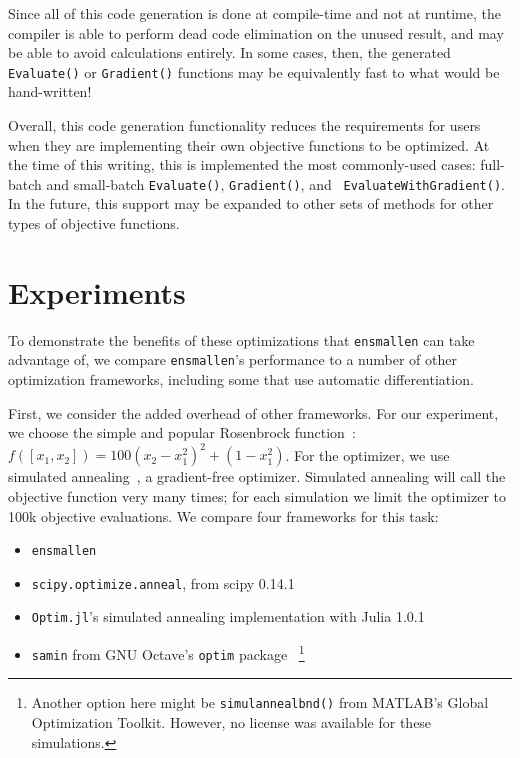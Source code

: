 \documentclass{article}
\begin{document}
Since all of this code generation is done at compile-time and not
at runtime, the compiler is able to perform dead code elimination
on the unused result, and may be able to avoid calculations entirely.  In some
cases, then, the generated {\tt Evaluate()} or {\tt Gradient()} functions may be
equivalently fast to what would be hand-written!

Overall, this code generation functionality reduces the requirements for users
when they are implementing their own objective functions to be optimized.  At
the time of this writing, this is implemented the most commonly-used cases:
full-batch and small-batch {\tt Evaluate()}, {\tt Gradient()}, and {\tt
EvaluateWithGradient()}.  In the future, this support may be expanded to other
sets of methods for other types of objective functions.


\vspace*{-0.3em}
\section{Experiments}
\vspace*{-0.5em}

To demonstrate the benefits of these optimizations that {\tt ensmallen} can take
advantage of, we compare {\tt ensmallen}'s performance to a number of other
optimization frameworks, including some that use automatic differentiation.

First, we consider the added overhead of other frameworks.  For our experiment,
we choose the simple and popular Rosenbrock function~\cite{Rosenbrock1960}:
$f([x_1, x_2]) = 100 (x_2 - x_1^2)^2 + (1 - x_1^2)$.  For the optimizer, we use
simulated annealing~\cite{kirkpatrick1983optimization},
a gradient-free optimizer.  Simulated annealing will call the objective function
very many times; for each simulation we limit the optimizer to 100k
objective evaluations.  We compare four frameworks for this task:

\vspace*{-0.3em}
\begin{itemize} \itemsep -1pt
  \item {\tt ensmallen}
  \item {\tt scipy.optimize.anneal}, from scipy 0.14.1~\cite{jones2014scipy}
  \item {\tt Optim.jl}'s simulated annealing implementation with Julia
1.0.1~\cite{mogensen2018optim}
  \item {\tt samin} from GNU Octave's {\tt optim} package~\cite{octave}
\footnote{Another option here might be {\tt simulannealbnd()} from MATLAB's
Global Optimization Toolkit.  However, no license was available for these
simulations.}
\end{itemize}
\vspace*{-0.3em}
\end{document}
